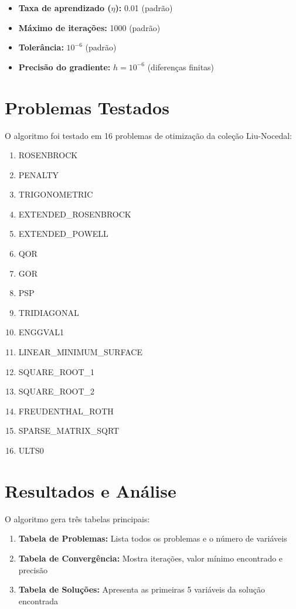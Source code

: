 \documentclass[12pt]{article}
\begin{document}
\begin{itemize}
    \item \textbf{Taxa de aprendizado ($\eta$):} 0.01 (padrão)
    \item \textbf{Máximo de iterações:} 1000 (padrão)
    \item \textbf{Tolerância:} $10^{-6}$ (padrão)
    \item \textbf{Precisão do gradiente:} $h = 10^{-6}$ (diferenças finitas)
\end{itemize}

\section{Problemas Testados}

O algoritmo foi testado em 16 problemas de otimização da coleção Liu-Nocedal:

\begin{enumerate}
    \item ROSENBROCK
    \item PENALTY
    \item TRIGONOMETRIC
    \item EXTENDED\_ROSENBROCK
    \item EXTENDED\_POWELL
    \item QOR
    \item GOR
    \item PSP
    \item TRIDIAGONAL
    \item ENGGVAL1
    \item LINEAR\_MINIMUM\_SURFACE
    \item SQUARE\_ROOT\_1
    \item SQUARE\_ROOT\_2
    \item FREUDENTHAL\_ROTH
    \item SPARSE\_MATRIX\_SQRT
    \item ULTS0
\end{enumerate}

\section{Resultados e Análise}

O algoritmo gera três tabelas principais:

\begin{enumerate}
    \item \textbf{Tabela de Problemas:} Lista todos os problemas e o número de variáveis
    \item \textbf{Tabela de Convergência:} Mostra iterações, valor mínimo encontrado e precisão
    \item \textbf{Tabela de Soluções:} Apresenta as primeiras 5 variáveis da solução encontrada
\end{enumerate}
\end{document}
